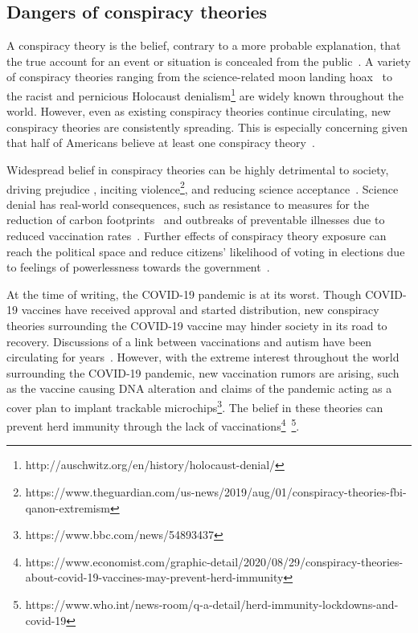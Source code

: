 \documentclass[11pt,a4paper]{article}
\begin{document}
\subsection{Dangers of conspiracy theories}
A conspiracy theory is the belief, contrary to a more probable explanation, that the true account for an event or situation is concealed from the public~\cite{goertzel1994belief}. 
A variety of conspiracy theories ranging from the science-related moon landing hoax~\cite{bizony2009all} to the racist and pernicious Holocaust denialism\footnote{http://auschwitz.org/en/history/holocaust-denial/} are widely known throughout the world.
However, even as existing conspiracy theories continue circulating, new conspiracy theories are consistently spreading. This is especially concerning given that half of Americans believe at least one conspiracy theory~\cite{oliver2014conspiracy}. 

Widespread belief in conspiracy theories can be highly detrimental to society, driving prejudice \cite{douglas2019understanding}, inciting violence\footnote{https://www.theguardian.com/us-news/2019/aug/01/conspiracy-theories-fbi-qanon-extremism}, and reducing science acceptance~\cite{VANDERLINDEN2015171,lewandowsky2013nasa}. Science denial has real-world consequences, such as resistance to measures for the reduction of carbon footprints~\cite{doi:10.1177/0096340215571908} and outbreaks of preventable illnesses due to reduced vaccination rates~\cite{goertzel2010conspiracy}. Further effects of conspiracy theory exposure can reach the political space and reduce citizens' likelihood of voting in elections due to feelings of powerlessness towards the government~\cite{jolley2014social}. 

At the time of writing, the COVID-19 pandemic is at its worst. Though COVID-19 vaccines have received approval and started distribution, new conspiracy theories surrounding the COVID-19 vaccine may hinder society in its road to recovery. Discussions of a link between vaccinations and autism have been circulating for years~\cite{jolley2014effects,kata2010postmodern}. However, with the extreme interest throughout the world surrounding the COVID-19 pandemic, new vaccination rumors are arising, such as the vaccine causing DNA alteration and claims of the pandemic acting as a cover plan to implant trackable microchips\footnote{https://www.bbc.com/news/54893437}. 
The belief in these theories can prevent herd immunity through the lack of vaccinations\footnote{https://www.economist.com/graphic-detail/2020/08/29/conspiracy-theories-about-covid-19-vaccines-may-prevent-herd-immunity}~\footnote{https://www.who.int/news-room/q-a-detail/herd-immunity-lockdowns-and-covid-19}.
\end{document}
